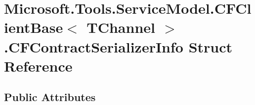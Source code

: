 \hypertarget{struct_microsoft_1_1_tools_1_1_service_model_1_1_c_f_client_base_3_01_t_channel_01_4_1_1_c_f_contract_serializer_info}{
\section{Microsoft.Tools.ServiceModel.CFClientBase$<$ TChannel $>$.CFContractSerializerInfo Struct Reference}
\label{struct_microsoft_1_1_tools_1_1_service_model_1_1_c_f_client_base_3_01_t_channel_01_4_1_1_c_f_contract_serializer_info}
}
\subsection*{Public Attributes}
